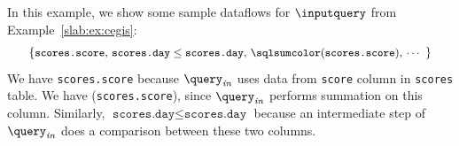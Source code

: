 \begin{example}
In this example, we show some sample dataflows for $\inputquery$ from Example~\ref{slab:ex:cegis}:
$$
\small
 \left \{
\text{\texttt{scores.score}, $\texttt{scores.day} \leq \texttt{scores.day}$, \sqlsumcolor(\texttt{scores.score}), $\dotsb$ }
\right \}
$$
We have \texttt{scores.score} because $\query_{\emph{in}}$ uses data from \texttt{score} column in \texttt{scores} table. 
We have \sqlsumcolor(\texttt{scores.score}), since $\query_{\emph{in}}$ performs summation on this column. 
Similarly, $\texttt{scores.day} \leq \texttt{scores.day}$ because an intermediate step of $\query_{\emph{in}}$ does a comparison between these two columns. 

\end{example}
